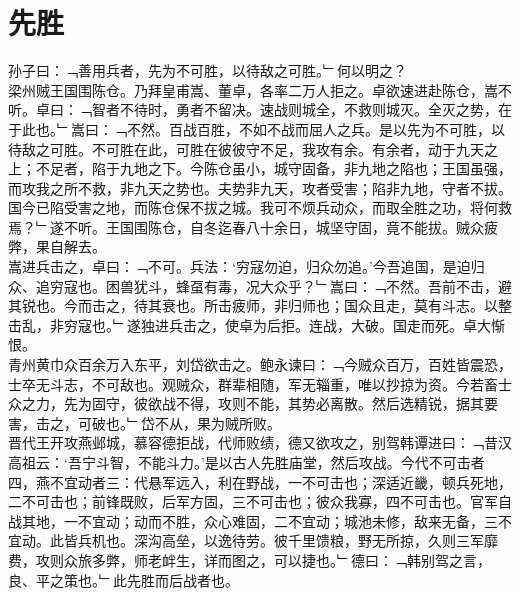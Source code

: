\chapter{先胜}%
孙子曰：﹁善用兵者，先为不可胜，以待敌之可胜。﹂何以明之？\\
梁州贼王国围陈仓。乃拜皇甫嵩、董卓，各率二万人拒之。卓欲速进赴陈仓，嵩不听。卓曰：﹁智者不待时，勇者不留决。速战则城全，不救则城灭。全灭之势，在于此也。﹂嵩曰：﹁不然。百战百胜，不如不战而屈人之兵。是以先为不可胜，以待敌之可胜。不可胜在此，可胜在彼彼守不足，我攻有余。有余者，动于九天之上；不足者，陷于九地之下。今陈仓虽小，城守固备，非九地之陷也；王国虽强，而攻我之所不救，非九天之势也。夫势非九天，攻者受害；陷非九地，守者不拔。国今已陷受害之地，而陈仓保不拔之城。我可不烦兵动众，而取全胜之功，将何救焉？﹂遂不听。王国围陈仓，自冬迄春八十余日，城坚守固，竟不能拔。贼众疲弊，果自解去。\\
嵩进兵击之，卓曰：﹁不可。兵法：‘穷寇勿迫，归众勿追。’今吾追国，是迫归众、追穷寇也。困兽犹斗，蜂虿有毒，况大众乎？﹂嵩曰：﹁不然。吾前不击，避其锐也。今而击之，待其衰也。所击疲师，非归师也；国众且走，莫有斗志。以整击乱，非穷寇也。﹂遂独进兵击之，使卓为后拒。连战，大破。国走而死。卓大惭恨。\\
青州黄巾众百余万入东平，刘岱欲击之。鲍永谏曰：﹁今贼众百万，百姓皆震恐，士卒无斗志，不可敌也。观贼众，群辈相随，军无辎重，唯以抄掠为资。今若畜士众之力，先为固守，彼欲战不得，攻则不能，其势必离散。然后选精锐，据其要害，击之，可破也。﹂岱不从，果为贼所败。\\
晋代王开攻燕邺城，慕容德拒战，代师败绩，德又欲攻之，别驾韩谭进曰：﹁昔汉高祖云：‘吾宁斗智，不能斗力。’是以古人先胜庙堂，然后攻战。今代不可击者四，燕不宜动者三：代悬军远入，利在野战，一不可击也；深适近畿，顿兵死地，二不可击也；前锋既败，后军方固，三不可击也；彼众我寡，四不可击也。官军自战其地，一不宜动；动而不胜，众心难固，二不宜动；城池未修，敌来无备，三不宜动。此皆兵机也。深沟高垒，以逸待劳。彼千里馈粮，野无所掠，久则三军靡费，攻则众旅多弊，师老衅生，详而图之，可以捷也。﹂德曰：﹁韩别驾之言，良、平之策也。﹂此先胜而后战者也。
%
%
